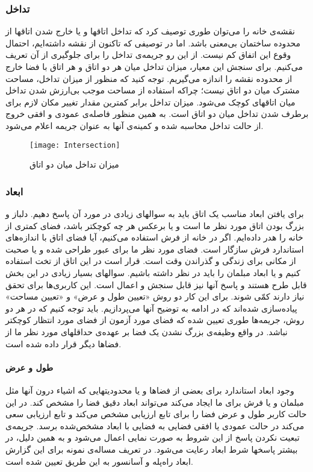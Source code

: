 \documentclass{report}
\begin{document}
\subsubsection{تداخل}
نقشه‌ی خانه را می‌توان طوری توصیف کرد که تداخل اتاقها و یا خارج شدن اتاقها از محدوده ساختمان بی‌معنی باشد. اما در توصیفی که تاکنون از نقشه داشته‌ایم، احتمال وقوع این اتفاق کم نیست. از این رو جریمه‌ی تداخل را برای جلوگیری از آن تعریف می‌کنیم.
برای سنجش این معیار، میزان تداخل میان هر دو اتاق و هر اتاق با فضا خارج از محدوده نقشه را اندازه می‌گیریم. توجه کنید که منظور از میزان تداخل، مساحت مشترک میان دو اتاق نیست؛ چراکه استفاده از مساحت موجب بی‌ارزش شدن تداخل میان اتاقهای کوچک می‌شود. میزان تداخل برابر کمترین مقدار تغییر مکان لازم برای برطرف شدن تداخل میان دو اتاق است. به همین منظور فاصله‌ی عمودی و افقی خروج از حالت تداخل محاسبه شده و کمینه‌ی آنها به عنوان جریمه اعلام می‌شود.
\begin{figure}[h] \centerline{\texttt{[image: Intersection]}} \caption{\label{fIntersection}
 میزان تداخل میان دو اتاق
 } \end{figure}

\subsubsection{ابعاد}
برای یافتن ابعاد مناسب یک اتاق باید به سوالهای زیادی در مورد آن پاسخ دهیم. دلباز و بزرگ بودن اتاق مورد نظر ما است و یا برعکس هر چه کوچکتر باشد، فضای کمتری از خانه را هدر داده‌ایم. اگر در خانه از فرش استفاده می‌کنیم، آیا فضای اتاق با اندازه‌های استاندارد فرش سازگار است. فضای مورد نظر ما برای عبور طراحی شده و یا صحبت از مکانی برای زندگی و گذراندن وقت است. قرار است در این اتاق از تخت استفاده کنیم و یا ابعاد مبلمان را باید در نظر داشته باشیم. سوالهای بسیار زیادی در این بخش قابل طرح هستند و پاسخ آنها نیز قابل سنجش و اعمال است.
این کاربری‌ها برای تحقق نیاز دارند کمّی شوند. برای این کار دو روش «تعیین طول و عرض» و «تعیین مساحت» پیاده‌سازی شده‌اند که در ادامه به توضیح آنها می‌پردازیم. باید توجه کنیم که در هر دو روش، جریمه‌ها طوری تعیین شده که فضای مورد آزمون از فضای مورد انتظار کوچکتر نباشد. در واقع وظیفه‌ی بزرگ نشدن یک فضا بر عهده‌ی حداقلهای مورد نظر ما از فضاها دیگر قرار داده شده است.

\paragraph{طول و عرض}
وجود ابعاد استاندارد برای بعضی از فضاها و یا محدودیتهایی که اشیاء درون آنها مثل مبلمان و یا فرش برای ما ایجاد می‌کند می‌تواند ابعاد دقیق فضا را مشخص کند. در این حالت کاربر طول و عرض فضا را برای تابع ارزیابی مشخص می‌کند و تابع ارزیابی سعی می‌کند در حالت عمودی یا افقی فضایی به فضایی با ابعاد مشخص‌شده برسد. جریمه‌ی تبعیت نکردن پاسخ از این شروط به صورت نمایی اعمال می‌شود و به همین دلیل، در بیشتر پاسخها شرط ابعاد رعایت می‌شود. در تعریف مساله‌ی نمونه برای این گزارش ابعاد راه‌پله و آسانسور به این طریق تعیین شده است.
\end{document}
